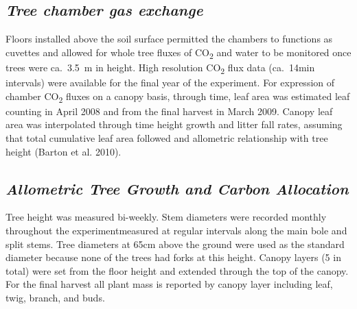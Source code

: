 \documentclass[a4paper]{article}
\begin{document}
\subsection*{\textit{Tree chamber gas exchange}}
Floors installed above the soil surface permitted the chambers to functions as cuvettes and allowed for whole tree fluxes of CO\textsubscript{2} and water to be monitored once trees were ca.~3.5~m in height.  High resolution CO\textsubscript{2} flux data (ca.~14min intervals) were available for the final year of the experiment. For expression of chamber CO\textsubscript{2} fluxes on a canopy basis, through time, leaf area was estimated leaf counting in April 2008 and from the final harvest in March 2009. Canopy leaf area was interpolated through time height growth and litter fall rates, assuming that total cumulative leaf area followed and allometric relationship with tree height (Barton et al. 2010).

\subsection*{\textit{Allometric Tree Growth and Carbon Allocation}}
Tree height was measured bi-weekly. Stem diameters were recorded  monthly throughout the experimentmeasured at regular intervals along the main bole and split stems. Tree diameters at 65cm above the ground were used as the standard diameter because none of the trees had forks at this height. Canopy layers (5 in total) were set from the floor height and extended through the top of the canopy.  For the final harvest all plant mass is reported by canopy layer including leaf, twig, branch, and buds.  
\end{document}
